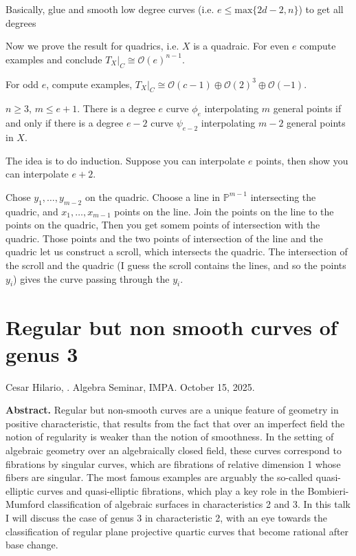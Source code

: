 \noindent
Basically, glue and smooth low degree curves
(i.e. $e \leq  \text{max}\{2d-2,n\}$)
to get all degrees


\medskip\noindent
Now we prove the result for quadrics,
i.e. $X$ is a quadraic.
For even $e$ compute examples and conclude
 $T_X|_C \cong \mathcal{O}(e)^{n-1}$.

For odd $e$, compute examples,
$T_X|_C\cong \mathcal{O}(c-1) \oplus
\mathcal{O}(2)^{3}\oplus \mathcal{O}(-1)$.

\begin{proposition}
\label{proposition-interpolation2}
$n\geq 3$, $m\leq  e+1$.
There is a degree $e$ curve $\phi_e$
interpolating
$m$ general points if and only if there is a
degree $e-2$ curve $\psi_{e-2}$ interpolating
$m-2$ general points in $X$.
\end{proposition}

\noindent
The idea is to do induction.
Suppose you can interpolate $e$ points,
then show you can interpolate $e+2$.

Chose $y_1,\ldots,y_{m-2}$ on the quadric.
Choose a line in $\mathbb{P}^{m-1}$
intersecting the quadric,
and $x_1,\ldots,x_{m-1}$ points on the line.
Join the points on the line to the points on
the quadric,
Then you get somem points of intersection
with the quadric.
Those points and the two points of
intersection of the line and the quadric
let us construct a scroll, which intersects
the quadric.
The intersection of the scroll and the
quadric
(I guess the scroll contains the lines, and
so the points $y_i$)
gives the curve passing through the $y_i$.

\section{Regular but non smooth curves of
genus 3}
\label{section-regular-but-non-smooth}

\noindent
Cesar Hilario, .
Algebra Seminar, IMPA.
October 15, 2025.

\medskip\noindent
{\bf Abstract.} Regular but non-smooth curves
are a unique feature of
geometry in positive characteristic, that
results from the fact that over an
imperfect field the notion of regularity is
weaker than the notion of
smoothness. In the setting of algebraic
geometry over an algebraically closed
field, these curves correspond to fibrations
by singular curves, which are
fibrations of relative dimension 1 whose
fibers are singular. The most famous
examples are arguably the so-called
quasi-elliptic curves and quasi-elliptic
fibrations, which play a key role in the
Bombieri-Mumford classification of
algebraic surfaces in characteristics 2 and
3. In this talk I will discuss the
case of genus 3 in characteristic 2, with an
eye towards the classification of
regular plane projective quartic curves that
become rational after base change.

